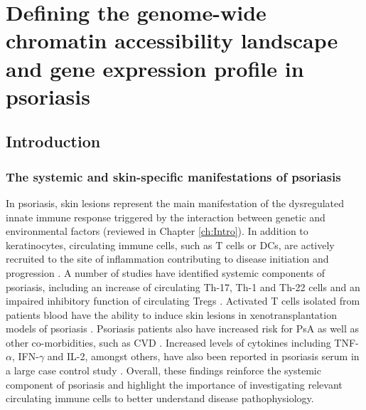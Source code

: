 \chapter{Defining the genome-wide chromatin accessibility landscape and gene expression profile in psoriasis}
\label{ch:Results2}


\section{Introduction}

\subsection{The systemic and skin-specific manifestations of psoriasis}

In psoriasis, skin lesions represent the main manifestation of the dysregulated innate immune response triggered by the interaction between genetic and environmental factors (reviewed in Chapter \ref{ch:Intro}). In addition to keratinocytes, circulating immune cells, such as T cells or DCs, are actively recruited to the site of inflammation contributing to disease initiation and progression \parencite{Johnson-Huang2009}. A number of studies have identified systemic components of psoriasis, including an increase of circulating Th-17, Th-1 and Th-22 cells and an impaired inhibitory function of circulating Tregs \parencite{Kagami2010,Sugiyama2005}. Activated T cells isolated from patients blood have the ability to induce skin lesions in xenotransplantation models of psoriasis \parencite{Wrone-Smith1996,Nickoloff1999}. Psoriasis patients also have increased risk for PsA as well as other co-morbidities, such as CVD \parencite{Ibrahim2009,Shapiro2007}. Increased levels of cytokines including TNF-$\alpha$, IFN-$\gamma$ and IL-2, amongst others, have also been reported in psoriasis serum in a large case control study \parencite{Bai2018}. Overall, these findings reinforce the systemic component of psoriasis and highlight the importance of investigating relevant circulating immune cells to better understand disease pathophysiology.



